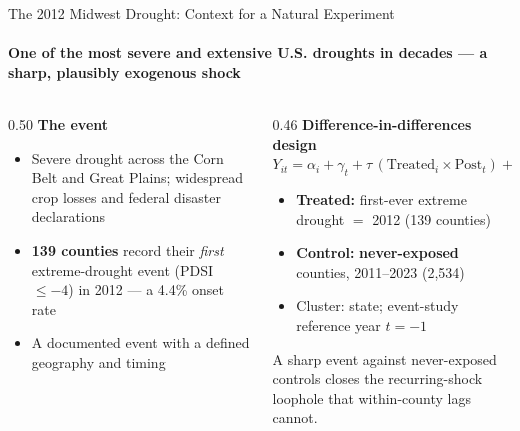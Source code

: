 \documentclass[aspectratio=169,11pt]{beamer}
\newcommand{\emphcolor}[1]{{\color{WarmOrange}\textbf{#1}}}
\newcommand{\tealtext}[1]{{\color{Teal}#1}}
\newcommand{\graytext}[1]{{\color{WarmGray}#1}}
\begin{document}
\begin{frame}{The 2012 Midwest Drought: Context for a Natural Experiment}
  \framesubtitle{One of the most severe and extensive U.S. droughts in decades --- a sharp, plausibly exogenous shock}
  \begin{columns}[T]
    \begin{column}{0.50\textwidth}
      \footnotesize
      \textbf{\tealtext{The event}}
      \begin{itemize}\itemsep0.14em
        \item Severe drought across the Corn Belt and Great Plains; widespread crop losses and federal disaster declarations
        \item \emphcolor{139 counties} record their \emph{first} extreme-drought event (PDSI \(\le -4\)) in 2012 --- a 4.4\% onset rate
        \item A documented event with a defined geography and timing
      \end{itemize}
    \end{column}
    \begin{column}{0.46\textwidth}
      \footnotesize
      \textbf{\tealtext{Difference-in-differences design}}\\[0.25em]
      \(Y_{it} = \alpha_i + \gamma_t + \tau\,(\text{Treated}_i \times \text{Post}_t) + \varepsilon_{it}\)
      \begin{itemize}\itemsep0.12em
        \item \emphcolor{Treated:} first-ever extreme drought \(=\) 2012 (139 counties)
        \item \emphcolor{Control:} \emphcolor{never-exposed} counties, 2011--2023 (2{,}534)
        \item Cluster: state; event-study reference year \(t=-1\)
      \end{itemize}
      \vspace{0.25em}
      \graytext{\scriptsize A sharp event against never-exposed controls closes the recurring-shock loophole that within-county lags cannot.}
    \end{column}
  \end{columns}
\end{frame}
\end{document}
